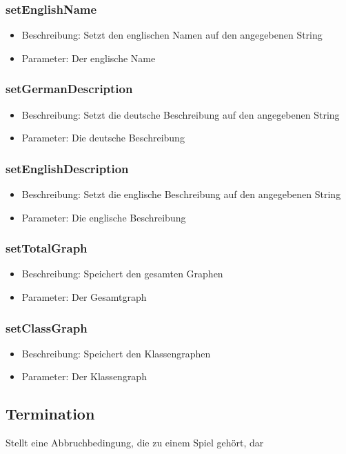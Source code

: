 \documentclass[a4paper]{scrreprt}
\begin{document}
	\subsubsection{setEnglishName}
	\begin{itemize}
		\item Beschreibung: Setzt den englischen Namen auf den angegebenen String
		\item Parameter: Der englische Name
	\end{itemize}
	\subsubsection{setGermanDescription}
	\begin{itemize}
		\item Beschreibung: Setzt die deutsche Beschreibung auf den angegebenen String
		\item Parameter: Die deutsche Beschreibung
	\end{itemize}
	\subsubsection{setEnglishDescription}
	\begin{itemize}
		\item Beschreibung: Setzt die englische Beschreibung auf den angegebenen String
		\item Parameter: Die englische Beschreibung
	\end{itemize}
	\subsubsection{setTotalGraph}
	\begin{itemize}
		\item Beschreibung: Speichert den gesamten Graphen
		\item Parameter: Der Gesamtgraph
	\end{itemize}
	\subsubsection{setClassGraph}
	\begin{itemize}
		\item Beschreibung: Speichert den Klassengraphen
		\item Parameter: Der Klassengraph
	\end{itemize}

	\subsection{Termination}
	Stellt eine Abbruchbedingung, die zu einem Spiel gehört, dar
\end{document}

